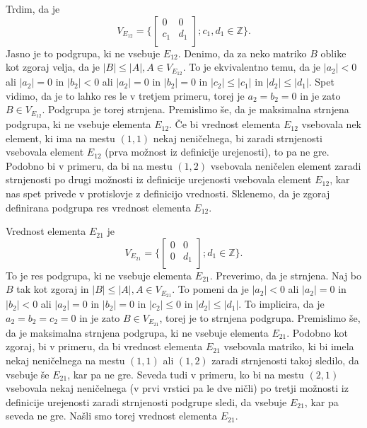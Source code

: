 \documentclass[a4paper, 12pt]{article}
\newcommand{\Z}{\mathbb{Z}}
\begin{document}
\begin{enumerate}
Trdim, da je 
$$
V_{E_{12}} = \big\{
\begin{bmatrix}
0 & 0 \\
c_1 & d_1 \\
\end{bmatrix};
c_1 , d_1 \in \Z
\big\}.
$$
Jasno je to podgrupa, ki ne vsebuje $E_{12}$. Denimo, da za neko matriko $B$ oblike kot zgoraj velja, da je $|B| \le |A|, A \in V_{E_{12}}$. To je ekvivalentno temu, da je $|a_2| < 0$ ali $|a_2| = 0 $ in $|b_2| < 0$ ali $|a_2| = 0 $ in $|b_2| = 0 $ in $|c_2| \le |c_1|$ in $|d_2| \le |d_1|$. Spet vidimo, da je to lahko res le v tretjem primeru, torej je $a_2 = b_2 =0$ in je zato $B\in V_{E_{12}}$. Podgrupa je torej strnjena. Premislimo še, da je maksimalna strnjena podgrupa, ki ne vsebuje elementa $E_{12}$. Če bi vrednost elementa $E_{12}$ vsebovala nek element, ki ima na mestu $(1,1)$ nekaj neničelnega, bi zaradi strnjenosti vsebovala element $E_{12}$ (prva možnost iz definicije urejenosti), to pa ne gre. Podobno bi v primeru, da bi na mestu $(1,2)$ vsebovala neničelen element zaradi strnjenosti po drugi možnosti iz definicije urejenosti vsebovala element $E_{12}$, kar nas spet privede v protislovje z definicijo vrednosti. Sklenemo, da je zgoraj definirana podgrupa res vrednost elementa $E_{12}$.

Vrednost elementa $E_{21}$ je 
$$
V_{E_{21}} = \big\{
\begin{bmatrix}
0 & 0 \\
0 & d_1 \\
\end{bmatrix};
d_1 \in \Z
\big\}.
$$
To je res podgrupa, ki ne vsebuje elementa $E_{21}$. Preverimo, da je strnjena. Naj bo $B$ tak kot zgoraj in $|B| \le |A|, A\in V_{E_{21}}$. To pomeni da je $|a_2| < 0$ ali $ |a_2| =0 $ in $|b_2|<0$ ali $|a_2| = 0 $ in $|b_2| = 0$ in $|c_2|\le 0$ in $|d_2| \le | d_1|$. To implicira, da je $a_2 = b_ 2 = c_2 = 0$ in je zato $B\in V_{E_{21}}$, torej je to strnjena podgrupa. Premislimo še, da je maksimalna strnjena podgrupa, ki ne vsebuje elementa $E_{21}$. Podobno kot zgoraj, bi v primeru, da bi vrednost elementa $E_{21}$ vsebovala matriko, ki bi imela nekaj neničelnega na mestu $(1,1)$ ali $(1,2)$ zaradi strnjenosti takoj sledilo, da vsebuje še $E_{21}$, kar pa ne gre. Seveda tudi v primeru, ko bi na mestu $(2,1)$ vsebovala nekaj neničelnega (v prvi vrstici pa le dve ničli) po tretji možnosti iz definicije urejenosti zaradi strnjenosti podgrupe sledi, da vsebuje $E_{21}$, kar pa seveda ne gre. Našli smo torej vrednost elementa $E_{21}$.


\end{enumerate}
\end{document}
